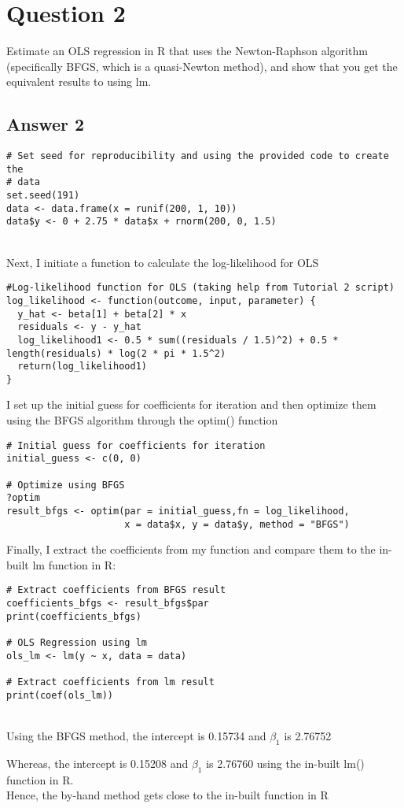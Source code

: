 \documentclass{article}
\begin{document}
\section{Question 2}

Estimate an OLS regression in R that uses the Newton-Raphson algorithm (specifically BFGS, which is a quasi-Newton method), and show that you get the equivalent results to using lm.

\subsection{Answer 2}
\begin{verbatim}
# Set seed for reproducibility and using the provided code to create the 
# data
set.seed(191)
data <- data.frame(x = runif(200, 1, 10))
data$y <- 0 + 2.75 * data$x + rnorm(200, 0, 1.5)
\end{verbatim}
\\
Next, I initiate a function to calculate the log-likelihood for OLS
\begin{verbatim}
#Log-likelihood function for OLS (taking help from Tutorial 2 script)
log_likelihood <- function(outcome, input, parameter) {
  y_hat <- beta[1] + beta[2] * x
  residuals <- y - y_hat
  log_likelihood1 <- 0.5 * sum((residuals / 1.5)^2) + 0.5 * length(residuals) * log(2 * pi * 1.5^2)
  return(log_likelihood1)
}

\end{verbatim}
I set up the initial guess for coefficients for iteration and then optimize them using the BFGS algorithm through the optim() function
\begin{verbatim}    
# Initial guess for coefficients for iteration
initial_guess <- c(0, 0)

# Optimize using BFGS
?optim
result_bfgs <- optim(par = initial_guess,fn = log_likelihood, 
                     x = data$x, y = data$y, method = "BFGS")

\end{verbatim}
Finally, I extract the coefficients from my function and compare them to the in-built lm function in R:
\begin{verbatim}    
# Extract coefficients from BFGS result
coefficients_bfgs <- result_bfgs$par
print(coefficients_bfgs)

# OLS Regression using lm
ols_lm <- lm(y ~ x, data = data)

# Extract coefficients from lm result
print(coef(ols_lm))
\end{verbatim}
\\
Using the BFGS method, the intercept is 0.15734 and $\beta_1$ is 2.76752

    Whereas, the intercept is 0.15208 and $\beta_1$ is 2.76760 using the in-built lm() function in R.
\\
Hence, the by-hand method gets close to the in-built function in R
\end{document}
